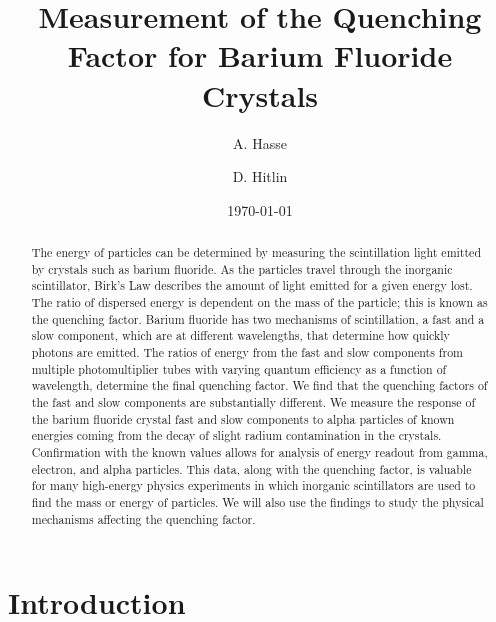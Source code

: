 \documentclass[aip, jmp, amsmath, amssymb, reprint, floatfix]{revtex4-1}
\begin{document}
\title[Measurement of the Quenching Factor for Barium Fluoride Crystals]{Measurement of the Quenching Factor for Barium Fluoride Crystals}

\author{A. Hasse}

\author{D. Hitlin}


\date{\today}

\begin{abstract}
The energy of particles can be determined by measuring the scintillation light emitted by crystals such as barium fluoride. As the particles travel through the inorganic scintillator, Birk’s Law describes the amount of light emitted for a given energy lost. The ratio of dispersed energy is dependent on the mass of the particle; this is known as the quenching factor. Barium fluoride has two mechanisms of scintillation, a fast and a slow component, which are at different wavelengths, that determine how quickly photons are emitted. The ratios of energy from the fast and slow components from multiple photomultiplier tubes with varying quantum efficiency as a function of wavelength, determine the final quenching factor. We find that the quenching factors of the fast and slow components are substantially different.
We measure the response of the barium fluoride crystal fast and slow components to alpha particles of known energies coming from the decay of slight radium contamination in the crystals. Confirmation with the known values allows for analysis of energy readout from gamma, electron, and alpha particles. This data, along with the quenching factor, is valuable for many high-energy physics experiments in which inorganic scintillators are used to find the mass or energy of particles. We will also use the findings to study the physical mechanisms affecting the quenching factor.
\end{abstract}

\maketitle

\section{\label{sec:level1}Introduction}
\end{document}
